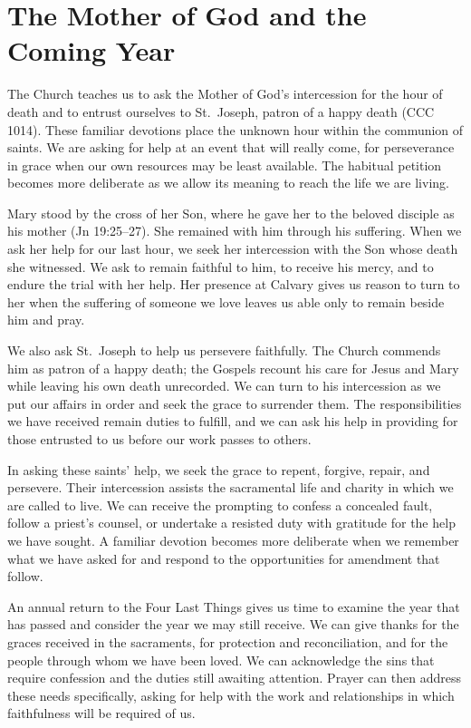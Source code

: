 \section{The Mother of God and the Coming Year}

The Church teaches us to ask the Mother of God's intercession for the hour of death and to entrust ourselves to St.~Joseph, patron of a happy death (CCC 1014). These familiar devotions place the unknown hour within the communion of saints. We are asking for help at an event that will really come, for perseverance in grace when our own resources may be least available. The habitual petition becomes more deliberate as we allow its meaning to reach the life we are living.

Mary stood by the cross of her Son, where he gave her to the beloved disciple as his mother (Jn 19:25--27). She remained with him through his suffering. When we ask her help for our last hour, we seek her intercession with the Son whose death she witnessed. We ask to remain faithful to him, to receive his mercy, and to endure the trial with her help. Her presence at Calvary gives us reason to turn to her when the suffering of someone we love leaves us able only to remain beside him and pray.

We also ask St.~Joseph to help us persevere faithfully. The Church commends him as patron of a happy death; the Gospels recount his care for Jesus and Mary while leaving his own death unrecorded. We can turn to his intercession as we put our affairs in order and seek the grace to surrender them. The responsibilities we have received remain duties to fulfill, and we can ask his help in providing for those entrusted to us before our work passes to others.

In asking these saints' help, we seek the grace to repent, forgive, repair, and persevere. Their intercession assists the sacramental life and charity in which we are called to live. We can receive the prompting to confess a concealed fault, follow a priest's counsel, or undertake a resisted duty with gratitude for the help we have sought. A familiar devotion becomes more deliberate when we remember what we have asked for and respond to the opportunities for amendment that follow.

An annual return to the Four Last Things gives us time to examine the year that has passed and consider the year we may still receive. We can give thanks for the graces received in the sacraments, for protection and reconciliation, and for the people through whom we have been loved. We can acknowledge the sins that require confession and the duties still awaiting attention. Prayer can then address these needs specifically, asking for help with the work and relationships in which faithfulness will be required of us.

